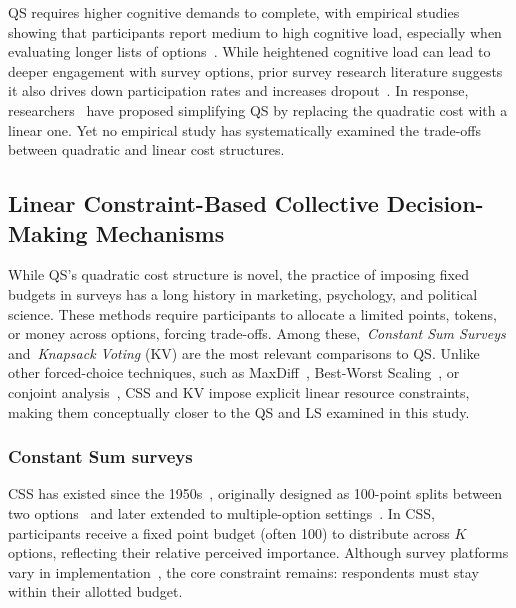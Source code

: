 QS requires higher cognitive demands to complete, with empirical studies showing that participants report medium to high cognitive load, especially when evaluating longer lists of options~\cite{cavaille2024cares}. While heightened cognitive load can lead to deeper engagement with survey options, prior survey research literature suggests it also drives down participation rates and increases dropout~\cite{brosnanCognitiveLoadReduction2021, galesicDropoutsWebEffects2006}. In response, researchers~\cite{cavaille2024cares} have proposed simplifying QS by replacing the quadratic cost with a linear one. Yet no empirical study has systematically examined the trade-offs between quadratic and linear cost structures.

\subsection{Linear Constraint-Based Collective Decision-Making Mechanisms}
\label{sec:related_works_force_choice}
While QS's quadratic cost structure is novel, the practice of imposing fixed budgets in surveys has a long history in marketing, psychology, and political science. These methods require participants to allocate a limited points, tokens, or money across options, forcing trade-offs. Among these,~\textit{Constant Sum Surveys} and~\textit{Knapsack Voting} (KV) are the most relevant comparisons to QS. Unlike other forced-choice techniques, such as MaxDiff~\cite{tsafarakisInvestigatingPreferencesIndividuals2019, schrammIncentiveAlignmentAnchored2024}, Best-Worst Scaling~\cite{louviereBestWorstScalingTheory2015}, or conjoint analysis~\cite{bagozziAdvancedMarketingResearch1994}, CSS and KV impose explicit linear resource constraints, making them conceptually closer to the QS and LS examined in this study.

\subsubsection{Constant Sum surveys}
CSS has existed since the 1950s~\cite{Malhotra_Naresh_K_2012, smithBasicMarketingResearch2013, Donald_R_Cooper2013-03-05}, originally designed as 100-point splits between two options~\cite{metfesselProposalQuantitativeReporting1947} and later extended to multiple-option settings~\cite{zhuSelfestimationWeightParameter1991, harwoodUnderstandingImplicitExplicit2019}. In CSS, participants receive a fixed point budget (often 100) to distribute across $K$ options, reflecting their relative perceived importance. Although survey platforms vary in implementation~\cite{qualtricsConstantSumQuestion2025, surveysparrowWhatConstantSum2025, lorraineConstantSumQuestion2022}, the core constraint remains: respondents must stay within their allotted budget.

